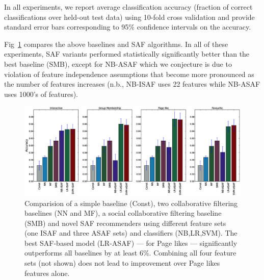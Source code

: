 In all experiments, we report average classification accuracy
(fraction of correct classifications over held-out test data) using
10-fold cross validation and provide standard error bars corresponding
to 95\% confidence intervals on the accuracy.

Fig~\ref{Fig1} compares the above baselines and SAF algorithms.  In
all of these experiments, SAF variants performed statistically
significantly better than the best baseline (SMB), except for NB-ASAF
which we conjecture is due to violation of feature independence
assumptions that become more pronounced as the number of features
increases (n.b., NB-ISAF uses 22 features while NB-ASAF uses 1000's of
features).

\begin{figure}[tbh!]
\hspace{-6mm}\includegraphics[width=190mm]{data/plots/accuracy/accuracyLargeNew.eps}
\caption{Comparision of a simple baseline (Const), two collaborative
  filtering baselines (NN and MF), a social collaborative filtering
  baseline (SMB) and novel SAF recommenders using different feature
  sets (one ISAF and three ASAF sets) and classifiers (NB,LR,SVM).
  The best SAF-based model (LR-ASAF) --- for Page likes --- significantly outperforms
  all baselines by at least 6\%.  Combining all four feature sets (not shown)
  does not lead to improvement over Page likes features alone.}
\label{Fig1}
\end{figure}

